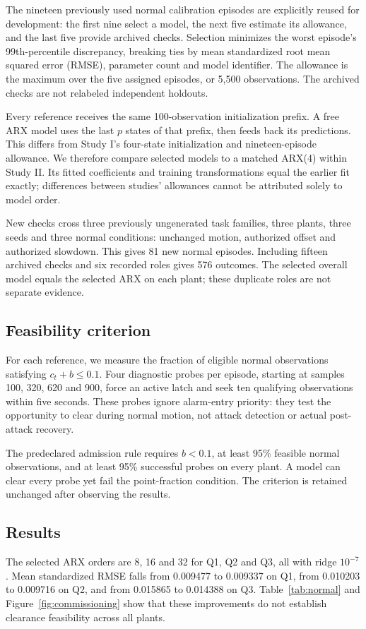 \documentclass[11pt]{article}
\begin{document}
The nineteen previously used normal calibration episodes are explicitly reused for development: the first nine select a model, the next five estimate its allowance, and the last five provide archived checks. Selection minimizes the worst episode's 99th-percentile discrepancy, breaking ties by mean standardized root mean squared error (RMSE), parameter count and model identifier. The allowance is the maximum over the five assigned episodes, or 5,500 observations. The archived checks are not relabeled independent holdouts.

Every reference receives the same 100-observation initialization prefix. A free ARX model uses the last $p$ states of that prefix, then feeds back its predictions. This differs from Study I's four-state initialization and nineteen-episode allowance. We therefore compare selected models to a matched ARX(4) within Study II. Its fitted coefficients and training transformations equal the earlier fit exactly; differences between studies' allowances cannot be attributed solely to model order.

New checks cross three previously ungenerated task families, three plants, three seeds and three normal conditions: unchanged motion, authorized offset and authorized slowdown. This gives 81 new normal episodes. Including fifteen archived checks and six recorded roles gives 576 outcomes. The selected overall model equals the selected ARX on each plant; these duplicate roles are not separate evidence.

\subsection{Feasibility criterion}
For each reference, we measure the fraction of eligible normal observations satisfying $c_t+b\le0.1$. Four diagnostic probes per episode, starting at samples 100, 320, 620 and 900, force an active latch and seek ten qualifying observations within five seconds. These probes ignore alarm-entry priority: they test the opportunity to clear during normal motion, not attack detection or actual post-attack recovery.

The predeclared admission rule requires $b<0.1$, at least 95\% feasible normal observations, and at least 95\% successful probes on every plant. A model can clear every probe yet fail the point-fraction condition. The criterion is retained unchanged after observing the results.

\subsection{Results}
The selected ARX orders are 8, 16 and 32 for Q1, Q2 and Q3, all with ridge $10^{-7}$. Mean standardized RMSE falls from 0.009477 to 0.009337 on Q1, from 0.010203 to 0.009716 on Q2, and from 0.015865 to 0.014388 on Q3. Table~\ref{tab:normal} and Figure~\ref{fig:commissioning} show that these improvements do not establish clearance feasibility across all plants.
\end{document}
